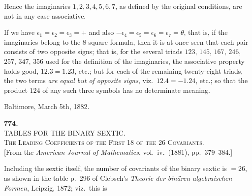 \documentclass[11pt,a4paper]{article}
\begin{document}
Hence the imaginaries $1,2,3,4,5,6,7$, as defined by the original
conditions, are not in any case associative.

If we have $\epsilon_{1}=\epsilon_{2}=\epsilon_{3}=+$ and also
$-\epsilon_{4}=\epsilon_{5}=\epsilon_{6}=\epsilon_{7}=\theta$, that is,
if the imaginaries belong to the $8$-square formula, then it is at
once seen that each pair consists of two opposite signs; that is, for
the several triads $123$, $145$, $167$, $246$, $257$, $347$, $356$
used for the definition of the imaginaries, the associative property
holds good, $12.3=1.23$, etc.; but for each of the remaining
twenty-eight triads, the two terms \textit{are equal but of opposite
signs}, viz.\ $12.4=-1.24$, etc.; so that the product $124$ of any
such three symbols has no determinate meaning.

\bigskip

\noindent Baltimore, March 5th, 1882.

\bigskip


\newpage
\begin{center}
\textbf{774.}\\[4pt]
\textsc{TABLES FOR THE BINARY SEXTIC.}\\[4pt]
\textsc{The Leading Coefficients of the First 18 of the 26 Covariants.}\\[4pt]
[From the \textit{American Journal of Mathematics}, vol.\ iv.\ (1881), pp.\ 379--384.]
\end{center}

\bigskip

\noindent
Including the sextic itself, the number of covariants of the binary
sextic is $=26$, as shown in the table p.\ 296 of Clebsch's
\textit{Theorie der bin\"aren algebraischen Formen}, Leipzig, 1872;
viz.\ this is
\end{document}
